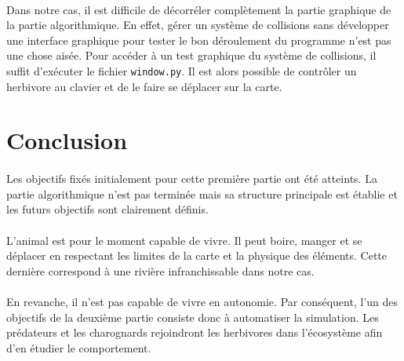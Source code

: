 \documentclass[a4paper,11pt,final,oneside]{article}
\begin{document}
\paragraph{} Dans notre cas, il est difficile de décorréler complètement la partie graphique de la partie algorithmique. En effet, gérer un système de collisions sans développer une interface graphique pour tester le bon déroulement du programme n'est pas une chose aisée. Pour accéder à un test graphique du système de collisions, il suffit d'exécuter le fichier \texttt{window.py}. Il est alors possible de contrôler un herbivore au clavier et de le faire se déplacer sur la carte.

\newpage
	\section*{Conclusion}

\paragraph{} Les objectifs fixés initialement pour cette première partie ont été atteints. La partie algorithmique n'est pas terminée mais sa structure principale est établie et les futurs objectifs sont clairement définis. 

\paragraph{} L'animal est pour le moment capable de vivre. Il peut boire, manger et se déplacer en respectant les limites de la carte et la physique des éléments. Cette dernière correspond à une rivière infranchissable dans notre cas.

\paragraph{} En revanche, il n'est pas capable de vivre en autonomie. Par conséquent, l'un des objectifs de la deuxième partie consiste donc à automatiser la simulation. Les prédateurs et les charognards rejoindront les herbivores dans l'écosystème afin d'en étudier le comportement.
\end{document}
